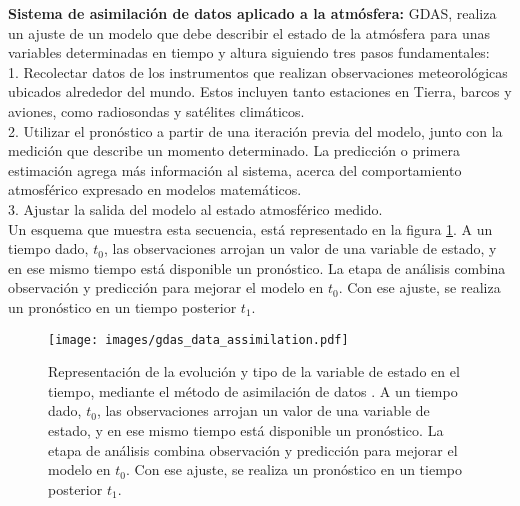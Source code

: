 \textbf{Sistema de asimilación de datos aplicado a la atmósfera: } GDAS, realiza un ajuste de un modelo que debe describir el estado de la atmósfera para unas variables determinadas en tiempo y altura siguiendo tres pasos fundamentales:\\

1. Recolectar datos de los instrumentos que realizan observaciones meteorológicas ubicados alrededor del mundo. Estos incluyen tanto estaciones en Tierra, barcos y aviones, como radiosondas y satélites climáticos.\\

2. Utilizar el pronóstico a partir de una iteración previa del modelo, junto con la medición que describe un momento determinado. La predicción o primera estimación agrega más información al sistema, acerca del comportamiento atmosférico expresado en modelos matemáticos. \\%

3. Ajustar la salida del modelo al estado atmosférico medido.\\

Un esquema que muestra esta secuencia, está representado en la figura \ref{fig:fig12}. A un tiempo dado, $ t_{0}$, las observaciones arrojan un valor de una variable de estado, y en ese mismo tiempo está disponible un pronóstico. La etapa de análisis combina observación y predicción para mejorar el modelo en $t_{0}$. Con ese ajuste, se realiza un pronóstico en un tiempo posterior $t_{1}$.

\begin{figure}[htb!]
\centering
\texttt{[image: images/gdas\_data\_assimilation.pdf]}
\caption[Representación del método de asimilación de datos.]{Representación de la evolución y tipo de la variable de estado en el tiempo, mediante el método de asimilación de datos  \cite{GDAS_Auger}. A un tiempo dado, $ t_{0}$, las observaciones arrojan un valor de una variable de estado, y en ese mismo tiempo está disponible un pronóstico. La etapa de análisis combina observación y predicción para mejorar el modelo en $t_{0}$. Con ese ajuste, se realiza un pronóstico en un tiempo posterior $t_{1}$.}
        \label{fig:fig12}
\end{figure}

